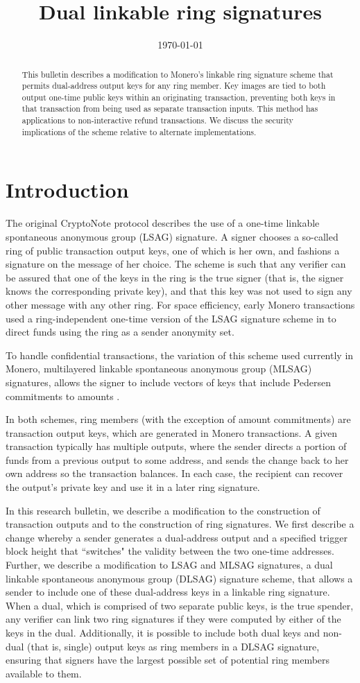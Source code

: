 \documentclass{mrl}
\title{Dual linkable ring signatures}
\date{\today}
\begin{document}
\begin{abstract}
This bulletin describes a modification to Monero's linkable ring signature scheme that permits dual-address output keys for any ring member. Key images are tied to both output one-time public keys within an originating transaction, preventing both keys in that transaction from being used as separate transaction inputs. This method has applications to non-interactive refund transactions. We discuss the security implications of the scheme relative to alternate implementations.
\end{abstract}

\section{Introduction}
The original CryptoNote protocol describes the use of a one-time linkable spontaneous anonymous group (LSAG) signature. A signer chooses a so-called ring of public transaction output keys, one of which is her own, and fashions a signature on the message of her choice. The scheme is such that any verifier can be assured that one of the keys in the ring is the true signer (that is, the signer knows the corresponding private key), and that this key was not used to sign any other message with any other ring. For space efficiency, early Monero transactions used a ring-independent one-time version of the LSAG signature scheme in \cite{liu} to direct funds using the ring as a sender anonymity set.

To handle confidential transactions, the variation of this scheme used currently in Monero, multilayered linkable spontaneous anonymous group (MLSAG) signatures, allows the signer to include vectors of keys that include Pedersen commitments to amounts \cite{shen}.

In both schemes, ring members (with the exception of amount commitments) are transaction output keys, which are generated in Monero transactions. A given transaction typically has multiple outputs, where the sender directs a portion of funds from a previous output to some address, and sends the change back to her own address so the transaction balances. In each case, the recipient can recover the output's private key and use it in a later ring signature.

In this research bulletin, we describe a modification to the construction of transaction outputs and to the construction of ring signatures. We first describe a change whereby a sender generates a dual-address output and a specified trigger block height that ``switches" the validity between the two one-time addresses. Further, we describe a modification to LSAG and MLSAG signatures, a dual linkable spontaneous anonymous group (DLSAG) signature scheme, that allows a sender to include one of these dual-address keys in a linkable ring signature. When a dual, which is comprised of two separate public keys, is the true spender, any verifier can link two ring signatures if they were computed by either of the keys in the dual. Additionally, it is possible to include both dual keys and non-dual (that is, single) output keys as ring members in a DLSAG signature, ensuring that signers have the largest possible set of potential ring members available to them.
\end{document}
